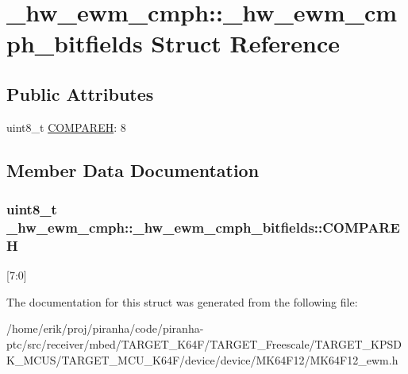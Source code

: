 \hypertarget{struct__hw__ewm__cmph_1_1__hw__ewm__cmph__bitfields}{}\section{\+\_\+hw\+\_\+ewm\+\_\+cmph\+:\+:\+\_\+hw\+\_\+ewm\+\_\+cmph\+\_\+bitfields Struct Reference}
\label{struct__hw__ewm__cmph_1_1__hw__ewm__cmph__bitfields}
\subsection*{Public Attributes}
\begin{DoxyCompactItemize}
\item 
uint8\+\_\+t \hyperlink{struct__hw__ewm__cmph_1_1__hw__ewm__cmph__bitfields_a30034f8de599a4e1442c3a714304ad89}{C\+O\+M\+P\+A\+R\+EH}\+: 8
\end{DoxyCompactItemize}


\subsection{Member Data Documentation}
\subsubsection[{\texorpdfstring{C\+O\+M\+P\+A\+R\+EH}{COMPAREH}}]{\setlength{\rightskip}{0pt plus 5cm}uint8\+\_\+t \+\_\+hw\+\_\+ewm\+\_\+cmph\+::\+\_\+hw\+\_\+ewm\+\_\+cmph\+\_\+bitfields\+::\+C\+O\+M\+P\+A\+R\+EH}\hypertarget{struct__hw__ewm__cmph_1_1__hw__ewm__cmph__bitfields_a30034f8de599a4e1442c3a714304ad89}{}\label{struct__hw__ewm__cmph_1_1__hw__ewm__cmph__bitfields_a30034f8de599a4e1442c3a714304ad89}
\mbox{[}7\+:0\mbox{]} 

The documentation for this struct was generated from the following file\+:\begin{DoxyCompactItemize}
\item 
/home/erik/proj/piranha/code/piranha-\/ptc/src/receiver/mbed/\+T\+A\+R\+G\+E\+T\+\_\+\+K64\+F/\+T\+A\+R\+G\+E\+T\+\_\+\+Freescale/\+T\+A\+R\+G\+E\+T\+\_\+\+K\+P\+S\+D\+K\+\_\+\+M\+C\+U\+S/\+T\+A\+R\+G\+E\+T\+\_\+\+M\+C\+U\+\_\+\+K64\+F/device/device/\+M\+K64\+F12/M\+K64\+F12\+\_\+ewm.\+h\end{DoxyCompactItemize}
